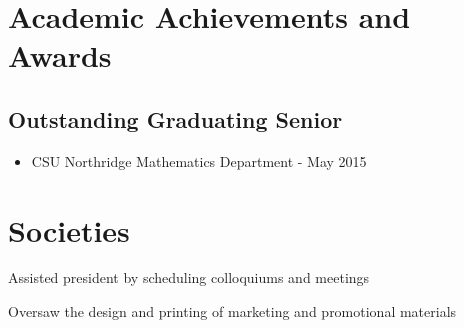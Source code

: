 \documentclass[letterpaper]{deedy-resume} %
\begin{document}
\begin{minipage}[t]{0.66\textwidth}


\section{Academic Achievements and Awards}
\subsection{Outstanding Graduating Senior}
\begin{itemize}
    \item CSU Northridge Mathematics Department - May 2015
\end{itemize}





\section{Societies}
\begin{tightitemize}
\item Assisted president by scheduling colloquiums and meetings
\item Oversaw the design and printing of marketing and promotional materials
\end{tightitemize}


\end{minipage}
\end{document}
